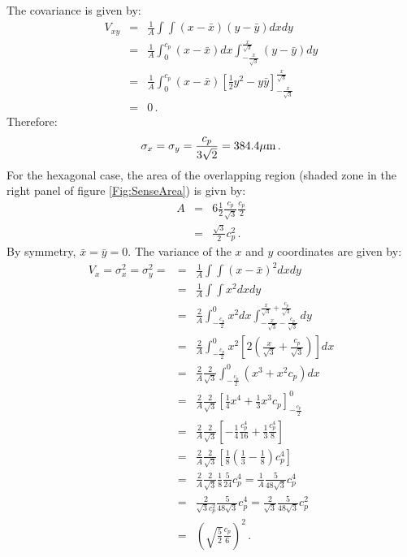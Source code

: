 The covariance is given by:
\begin{eqnarray}
  V_{xy} &=& \frac{1}{A} \int \int (x-\bar{x}) (y-\bar{y}) dx dy         \\
        &=& \frac{1}{A} \int_{0}^{c_p} (x-\bar{x}) dx
            \int_{-\frac{x}{\sqrt{3}}}^{\frac{x}{\sqrt{3}}}(y-\bar{y}) dy     \\
        &=& \frac{1}{A} \int_{0}^{c_p} (x-\bar{x})
            \left[ 
              \frac{1}{2}y^2 - y \bar{y} 
            \right]_{-\frac{x}{\sqrt{3}}}^{\frac{x}{\sqrt{3}}}                \\
        &=& 0 \, .
\end{eqnarray}
Therefore: 
\begin{equation}
  \sigma_{x}=\sigma_{y}=\frac{c_p}{3\sqrt{2}} = 384.4 \mu{\rm m} \, .
\end{equation}
For the hexagonal case, the area of the overlapping region (shaded
zone in the right panel of figure \ref{Fig:SenseArea}) is givn by:
\begin{eqnarray}
  A & = & 6 \frac{1}{2} \frac{c_p}{\sqrt{3}} \frac{c_p}{2} \\
    & = & \frac{\sqrt{3}}{2}c_p^{2} \, .
\end{eqnarray}
By symmetry, $\bar{x} = \bar{y} = 0$.
The variance of the $x$ and $y$ coordinates are given by:
\begin{eqnarray}
  V_x = \sigma^2_x = \sigma^2_y =
        &=& \frac{1}{A} \int \int (x-\bar{x})^{2} dx dy \\
        &=& \frac{1}{A} \int \int x^{2} dx dy \\
        &=& \frac{2}{A}  \int_{-\frac{c_p}{2}}^{0}x^{2} dx 
            \int_{-\frac{x}{\sqrt{3}}-\frac{c_p}{\sqrt{3}}}
                ^{\frac{x}{\sqrt{3}}+\frac{c_p}{\sqrt{3}}} dy \nonumber \\
        &=& \frac{2}{A}\int_{-\frac{c_p}{2}}^{0}x^{2} 
            \left[ 2 \left( \frac{x}{\sqrt{3}}+\frac{c_p}{\sqrt{3}}  
            \right) \right] dx \\
        &=& \frac{2}{A}\frac{2}{\sqrt{3}} \int_{-\frac{c_p}{2}}^{0} 
            \left( x^{3}+ x^{2}c_p \right)dx \nonumber \\
        &=& \frac{2}{A}\frac{2}{\sqrt{3}} \left[ \frac{1}{4}
            x^4 +\frac{1}{3} x^3 c_p\right]_{-\frac{c_p}{2}}^{0} \\
        &=& \frac{2}{A}\frac{2}{\sqrt{3}} \left[ -\frac{1}{4}
            \frac{c_p^{4}}{16}+\frac{1}{3}\frac{c_p^{4}}{8}\right] \\
        &=& \frac{2}{A}\frac{2}{\sqrt{3}}
            \left[ \frac{1}{8} \left( \frac{1}{3}-\frac{1}{8} 
            \right) c_p^4 \right]\\
        &=& \frac{2}{A}\frac{2}{\sqrt{3}} \frac{1}{8} \frac{5}{24} c_p^4
         =  \frac{1}{A} \frac{5}{48\sqrt{3}} c_p^4 \\
        &=& \frac{2}{\sqrt{3}c_p^{2}} \frac{5}{48\sqrt{3}} c_p^4 
         =  \frac{2}{\sqrt{3}} \frac{5}{48\sqrt{3}} c_p^2 \\
        &=& \left( \sqrt{\frac{5}{2}}\frac{c_p}{6} \right)^2 \, .
\end{eqnarray}
